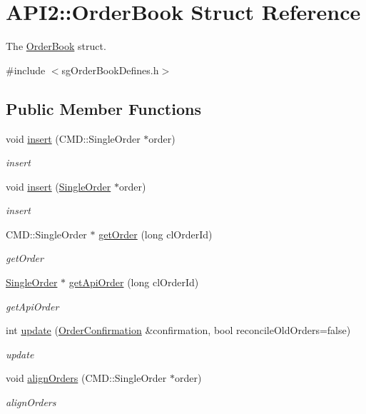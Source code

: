 \hypertarget{struct_a_p_i2_1_1_order_book}{\section{A\-P\-I2\-:\-:Order\-Book Struct Reference}
\label{struct_a_p_i2_1_1_order_book}
}


The \hyperlink{struct_a_p_i2_1_1_order_book}{Order\-Book} struct.  




{\ttfamily \#include $<$sg\-Order\-Book\-Defines.\-h$>$}

\subsection*{Public Member Functions}
\begin{DoxyCompactItemize}
\item 
void \hyperlink{struct_a_p_i2_1_1_order_book_aa316603a509b7bf795c89bfa28df21da}{insert} (C\-M\-D\-::\-Single\-Order $\ast$order)
\begin{DoxyCompactList}\small\item\em insert \end{DoxyCompactList}\item 
void \hyperlink{struct_a_p_i2_1_1_order_book_a13e93a941e87b42e55bbe752defce281}{insert} (\hyperlink{class_a_p_i2_1_1_single_order}{Single\-Order} $\ast$order)
\begin{DoxyCompactList}\small\item\em insert \end{DoxyCompactList}\item 
C\-M\-D\-::\-Single\-Order $\ast$ \hyperlink{struct_a_p_i2_1_1_order_book_ae4175d74b23fbfac49409193c07f5c6d}{get\-Order} (long cl\-Order\-Id)
\begin{DoxyCompactList}\small\item\em get\-Order \end{DoxyCompactList}\item 
\hyperlink{class_a_p_i2_1_1_single_order}{Single\-Order} $\ast$ \hyperlink{struct_a_p_i2_1_1_order_book_ac8cb10c78564316a10766b1180fd09b3}{get\-Api\-Order} (long cl\-Order\-Id)
\begin{DoxyCompactList}\small\item\em get\-Api\-Order \end{DoxyCompactList}\item 
int \hyperlink{struct_a_p_i2_1_1_order_book_abbf637e6c979e6c4f6b40ae6bc99c9e3}{update} (\hyperlink{class_a_p_i2_1_1_order_confirmation}{Order\-Confirmation} \&confirmation, bool reconcile\-Old\-Orders=false)
\begin{DoxyCompactList}\small\item\em update \end{DoxyCompactList}\item 
void \hyperlink{struct_a_p_i2_1_1_order_book_a3fbef26341390640bc8168d4a4f0fc8c}{align\-Orders} (C\-M\-D\-::\-Single\-Order $\ast$order)
\begin{DoxyCompactList}\small\item\em align\-Orders \end{DoxyCompactList}\end{DoxyCompactItemize}
